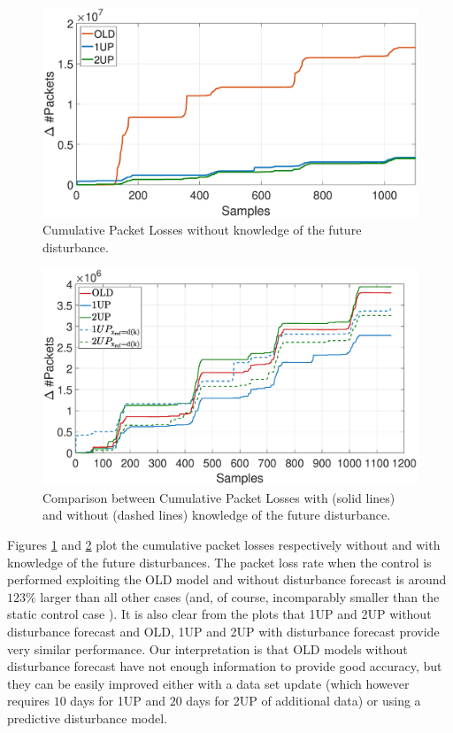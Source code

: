  \begin{figure}[h!]
	\centering
	\includegraphics[trim={120 0 120 0}, width=0.9\linewidth]{figure/cumPL1.eps}
	\caption{Cumulative Packet Losses without knowledge of the future disturbance.}
	\label{fig:{MPC1}}
\end{figure}
\begin{figure}[h!]
	\centering
	\includegraphics[trim={120 0 120 0},width=0.9\linewidth]{figure/cumPL_Total.eps}
	\caption{Comparison between Cumulative Packet Losses with (solid lines)  and without (dashed lines) knowledge of the future disturbance.}
	\label{fig:{MPC2}}
\end{figure}
 Figures \ref{fig:{MPC1}} and \ref{fig:{MPC2}} plot the cumulative packet losses respectively without and with knowledge of the future disturbances. The packet loss rate when the control is performed exploiting the OLD model and without disturbance forecast is around $123\%$ larger than all other cases (and, of course, incomparably smaller than the static control case \cite{Notiziario}). It is also clear from the plots that 1UP and 2UP without disturbance forecast and OLD, 1UP and 2UP with disturbance forecast provide very similar performance. Our interpretation is that OLD models without disturbance forecast have not enough information to provide good accuracy, but they can be easily improved either with a data set update (which however requires $10$ days for 1UP and $20$ days for 2UP of additional data) or using a predictive disturbance model.

